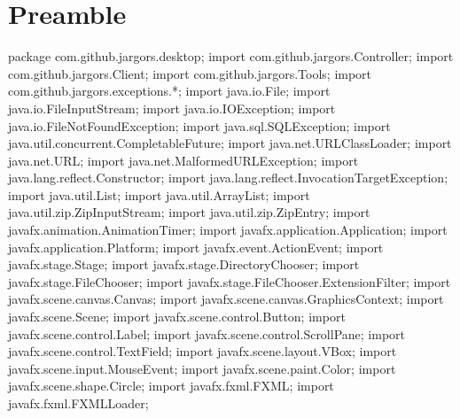 \section{Preamble}
\nwenddocs{}\endmoddef{}
package com.github.jargors.desktop;
import com.github.jargors.Controller;
import com.github.jargors.Client;
import com.github.jargors.Tools;
import com.github.jargors.exceptions.*;
\nwendcode{}\nwdocspar
\nwenddocs{}\plusendmoddef
import java.io.File;
import java.io.FileInputStream;
import java.io.IOException;
import java.io.FileNotFoundException;
import java.sql.SQLException;
import java.util.concurrent.CompletableFuture;
import java.net.URLClassLoader;
import java.net.URL;
import java.net.MalformedURLException;
import java.lang.reflect.Constructor;
import java.lang.reflect.InvocationTargetException;
import java.util.List;
import java.util.ArrayList;
import java.util.zip.ZipInputStream;
import java.util.zip.ZipEntry;
\nwendcode{}\nwdocspar
\nwenddocs{}\plusendmoddef
import javafx.animation.AnimationTimer;
import javafx.application.Application;
import javafx.application.Platform;
import javafx.event.ActionEvent;
import javafx.stage.Stage;
import javafx.stage.DirectoryChooser;
import javafx.stage.FileChooser;
import javafx.stage.FileChooser.ExtensionFilter;
import javafx.scene.canvas.Canvas;
import javafx.scene.canvas.GraphicsContext;
import javafx.scene.Scene;
import javafx.scene.control.Button;
import javafx.scene.control.Label;
import javafx.scene.control.ScrollPane;
import javafx.scene.control.TextField;
import javafx.scene.layout.VBox;
import javafx.scene.input.MouseEvent;
import javafx.scene.paint.Color;
import javafx.scene.shape.Circle;
import javafx.fxml.FXML;
import javafx.fxml.FXMLLoader;
\nwendcode{}\nwdocspar

